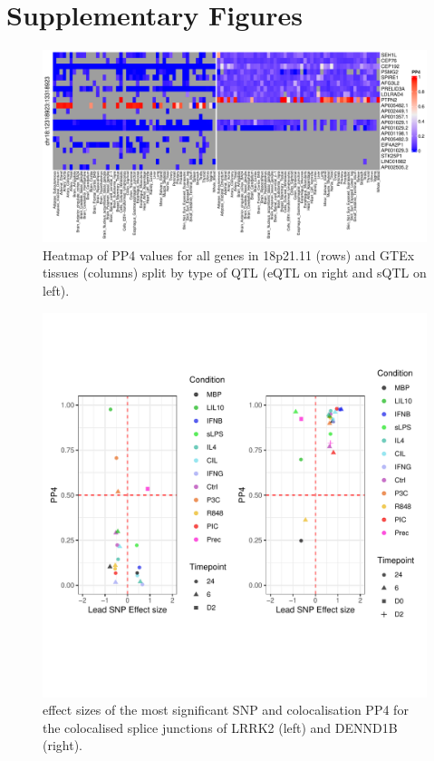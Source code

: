 \section{Supplementary Figures}

\begin{figure}[H]
  \centering
  \includegraphics[width=1.0\textwidth]{ptpn2_gtex}
  \caption{Heatmap of PP4 values for all genes in 18p21.11 (rows) and GTEx tissues (columns) split by type of QTL (eQTL on right and sQTL on left).}
  \label{fig:ptpn2_gtex}   
\end{figure}

\begin{figure}[H]
  \centering
  \includegraphics[width=1.0\textwidth]{lrrk2_dennd1b}
  \vspace{-70pt}
  \caption{effect sizes of the most significant SNP and colocalisation PP4 for the colocalised splice junctions of LRRK2 (left) and DENND1B (right).}
  \label{fig:lrrk2_dennd1b}   
\end{figure}

